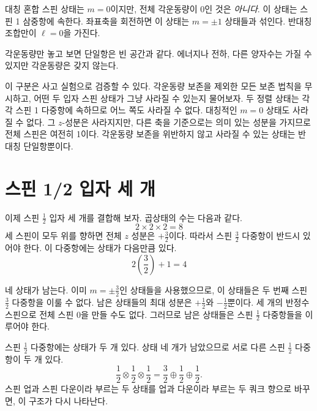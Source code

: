대칭 혼합 스핀 상태는 \(m=0\)이지만, 전체 각운동량이 0인 것은 \emph{아니다}. 이 상태는 스핀 1 삼중항에 속한다. 좌표축을 회전하면 이 상태는 \(m=\pm1\) 상태들과 섞인다. 반대칭 조합만이 \(\ell=0\)을 가진다.

각운동량만 놓고 보면 단일항은 빈 공간과 같다. 에너지나 전하, 다른 양자수는 가질 수 있지만 각운동량은 갖지 않는다.

이 구분은 사고 실험으로 검증할 수 있다. 각운동량 보존을 제외한 모든 보존 법칙을 무시하고, 어떤 두 입자 스핀 상태가 그냥 사라질 수 있는지 물어보자. 두 정렬 상태는 각각 스핀 1 다중항에 속하므로 어느 쪽도 사라질 수 없다. 대칭적인 \(m=0\) 상태도 사라질 수 없다. 그 \(z\)-성분은 사라지지만, 다른 축을 기준으로는 의미 있는 성분을 가지므로 전체 스핀은 여전히 1이다. 각운동량 보존을 위반하지 않고 사라질 수 있는 상태는 반대칭 단일항뿐이다.

\begin{classroomqa}
\end{classroomqa}

\section{스핀 1/2 입자 세 개}

이제 스핀 \(\tfrac12\) 입자 세 개를 결합해 보자. 곱상태의 수는 다음과 같다.
\begin{equation}
2\times2\times2=8
\end{equation}
세 스핀이 모두 위를 향하면 전체 \(z\) 성분은 \(+\tfrac32\)이다. 따라서 스핀 \(\tfrac32\) 다중항이 반드시 있어야 한다. 이 다중항에는 상태가 다음만큼 있다.
\begin{equation}
2\left(\frac32\right)+1=4
\end{equation}

네 상태가 남는다. 이미 \(m=\pm\tfrac32\)인 상태들을 사용했으므로, 이 상태들은 두 번째 스핀 \(\tfrac32\) 다중항을 이룰 수 없다. 남은 상태들의 최대 성분은 \(+\tfrac12\)와 \(-\tfrac12\)뿐이다. 세 개의 반정수 스핀으로 전체 스핀 0을 만들 수도 없다. 그러므로 남은 상태들은 스핀 \(\tfrac12\) 다중항들을 이루어야 한다.

스핀 \(\tfrac12\) 다중항에는 상태가 두 개 있다. 상태 네 개가 남았으므로 서로 다른 스핀 \(\tfrac12\) 다중항이 두 개 있다.
\begin{equation}
\frac12\otimes\frac12\otimes\frac12
=
\frac32\oplus\frac12\oplus\frac12.
\end{equation}
스핀 업과 스핀 다운이라 부르는 두 상태를 업과 다운이라 부르는 두 쿼크 향으로 바꾸면, 이 구조가 다시 나타난다.

